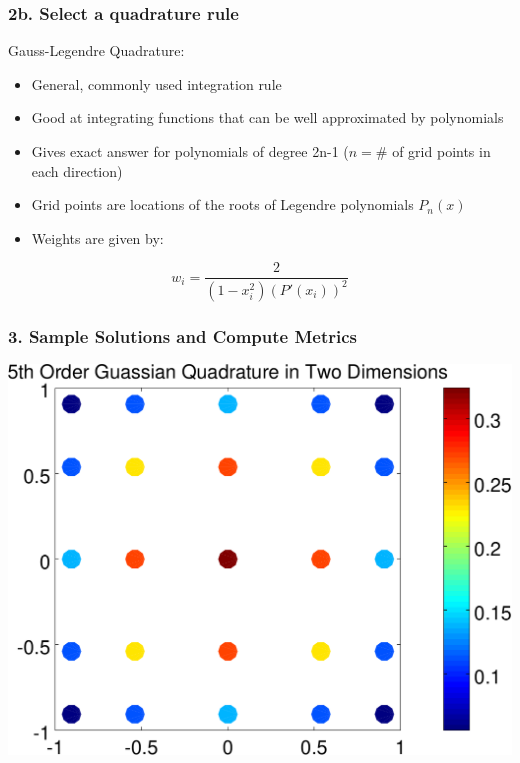 \documentclass{beamer}
\theoremstyle{plain}
\theoremstyle{definition}
\begin{document}
\begin{frame}\frametitle{2b. Select a quadrature rule}
  Gauss-Legendre Quadrature:
  \begin{itemize}
    \item General, commonly used integration rule
    \item Good at integrating functions that can be well approximated by polynomials
    \item Gives exact answer for polynomials of degree 2n-1 ($n = \#$ of grid points in each direction)
    \item Grid points are locations of the roots of Legendre polynomials $P_n(x)$
    \item Weights are given by:
  \end{itemize}

  \begin{equation*}
    w_i = \frac{2}{(1-x_i^2)(P'(x_i))^2}
  \end{equation*}

\end{frame}

\begin{frame}\frametitle{3. Sample Solutions and Compute Metrics}
  \begin{center}
    \includegraphics[scale = .5]{gaussian-quadrature.pdf}
  \end{center}
\end{frame}
\end{document}
